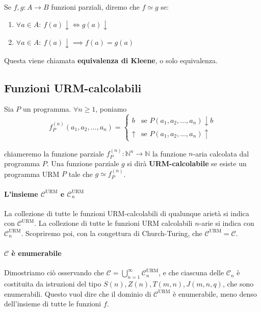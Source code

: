 	Se $f,g : A \to B$ funzioni parziali, diremo che $f \simeq g$ se:
	\begin{enumerate}
		\item $\forall a \in A: \ f(a)\downarrow \Leftrightarrow g(a)\downarrow$
		\item $\forall a \in A: \ f(a)\downarrow \implies f(a) = g(a) $
	\end{enumerate}
	Questa viene chiamata \textbf{equivalenza di Kleene}, o solo equivalenza.
	
	
	
	\subsection{Funzioni URM-calcolabili}
	Sia $P$ un programma. $\forall n \geq 1$, poniamo
	$$
	f_P^{(n)}(a_1, a_2, \ldots, a_n) =
	\begin{cases}
		b & \text{se } P(a_1, a_2, \ldots, a_n) \downarrow b \\[6pt]
		\uparrow & \text{se } P(a_1, a_2, \ldots, a_n) \uparrow
	\end{cases}
	$$
	
	chiameremo la funzione parziale $f_P^{(n)} : \mathbb{N}^n \to \mathbb{N}$ la funzione $n$-aria calcolata dal programma $P$.
	Una funzione parziale $g$ si dirà \textbf{URM-calcolabile} se esiste un programma URM $P$ tale che $g \simeq f_P^{(n)}$.

	\paragraph{L'insieme $\mathcal{C}^\text{URM}$ e $\mathcal{C}_n^\text{URM}$}
	La collezione di tutte le funzioni URM-calcolabili  di qualunque arietà si indica con $\mathcal C^\text{URM}$. La collezione di tutte le funzioni URM calcolabili $n$-arie si indica con $\mathcal C_n^\text{URM}$. Scopriremo poi, con la congettura di Church-Turing, che $\mathcal C^\text{URM} = \mathcal C$.
	
	\paragraph{$\mathcal{C}$ è enumerabile} Dimostriamo ciò osservando che $\mathcal{C} = \bigcup_{n=1}^\infty \mathcal C_n^\text{URM}$, e che ciascuna delle $\mathcal C_n$ è costituita da istruzioni del tipo $S(n), Z(n), T(m,n), J(m,n,q)$, che sono enumerabili. Questo vuol dire che il dominio di $\mathcal C^\text{URM}$ è enumerabile, meno denso dell'insieme di tutte le funzioni $f$. 
	

